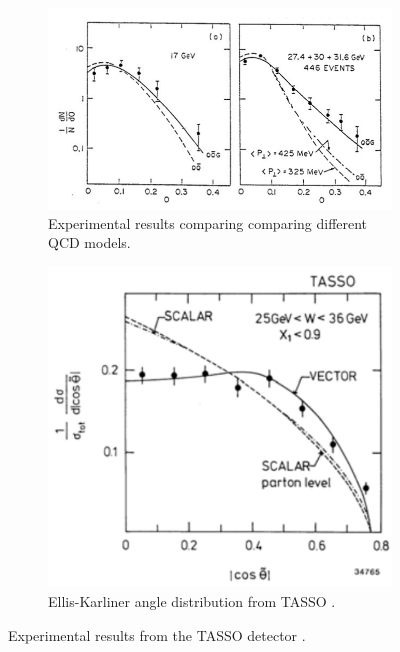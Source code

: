 \begin{figure}
    \centering
    \begin{subfigure}[B]{.5\textwidth}   %
        \centering
        \includegraphics[width=1.1\textwidth]{figs/gluonResultsA.png}
        \caption{Experimental results comparing comparing different QCD models\cite{Branson:1994eu}.}
        \label{fig:GluonResultsA}
    \end{subfigure}
    \begin{subfigure}[B]{.45\textwidth}   %
        \centering
        \includegraphics[width=.8\textwidth]{figs/gluonResultsB.png}
        \caption{Ellis-Karliner angle distribution from TASSO \cite{Soding:1996zk}.}
        \label{fig:GluonResultsB}
    \end{subfigure}
    \caption{Experimental results from the TASSO detector \cite{Branson:1994eu, Soding:1996zk}.}
\end{figure}

